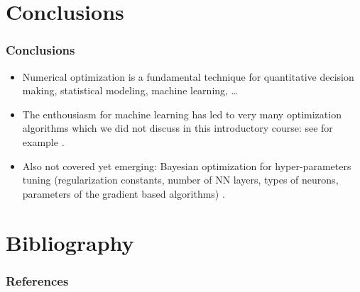 \documentclass[12pt]{beamer}
\begin{document}
\section*{Conclusions}

\begin{frame}
\frametitle{Conclusions}
\begin{itemize}
\item Numerical optimization is a fundamental technique for quantitative decision making, statistical modeling, machine learning, \ldots
\item The enthousiasm for machine learning has led to very many optimization algorithms which we did not discuss in this introductory course: see for example \cite{sun2019survey,sra2012optimization}. 
\item Also not covered yet emerging: Bayesian optimization for hyper-parameters tuning (regularization constants, number of NN layers, types of neurons, parameters of the gradient based algorithms) \cite{snoek2012practical}.
\end{itemize}
\end{frame}

\section{Bibliography}

\begin{frame}[allowframebreaks]
\frametitle{References}
\scriptsize
%   
   
   
\end{frame}
\end{document}
